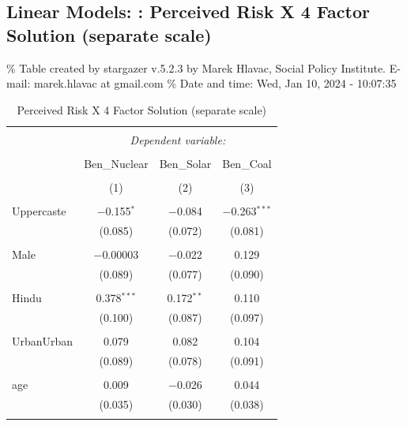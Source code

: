 \documentclass[
]{article}
\begin{document}
\hypertarget{linear-models-perceived-risk-x-4-factor-solution-separate-scale}{%
\subsection{Linear Models: : Perceived Risk X 4 Factor Solution
(separate
scale)}\label{linear-models-perceived-risk-x-4-factor-solution-separate-scale}}

\begingroup\setlength{\tabcolsep}{1pt}

\renewcommand{\arraystretch}{0.7}

\% Table created by stargazer v.5.2.3 by Marek Hlavac, Social Policy
Institute. E-mail: marek.hlavac at gmail.com \% Date and time: Wed, Jan
10, 2024 - 10:07:35

\begin{table}[!htbp] \centering 
  \caption{Perceived Risk X 4 Factor Solution (separate scale)} 
  \label{} 
\begin{tabular}{@{\extracolsep{5pt}}lccc} 
\\[-1.8ex]\hline 
\hline \\[-1.8ex] 
 & \multicolumn{3}{c}{\textit{Dependent variable:}} \\ 
\cline{2-4} 
\\[-1.8ex] & Ben\_Nuclear & Ben\_Solar & Ben\_Coal \\ 
\\[-1.8ex] & (1) & (2) & (3)\\ 
\hline \\[-1.8ex] 
 Uppercaste & $-$0.155$^{*}$ & $-$0.084 & $-$0.263$^{***}$ \\ 
  & (0.085) & (0.072) & (0.081) \\ 
  & & & \\ 
 Male & $-$0.00003 & $-$0.022 & 0.129 \\ 
  & (0.089) & (0.077) & (0.090) \\ 
  & & & \\ 
 Hindu & 0.378$^{***}$ & 0.172$^{**}$ & 0.110 \\ 
  & (0.100) & (0.087) & (0.097) \\ 
  & & & \\ 
 UrbanUrban & 0.079 & 0.082 & 0.104 \\ 
  & (0.089) & (0.078) & (0.091) \\ 
  & & & \\ 
 age & 0.009 & $-$0.026 & 0.044 \\ 
  & (0.035) & (0.030) & (0.038) \\ 
  & & & \\ 

\end{tabular}
\end{table}
\end{document}
